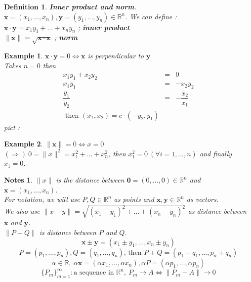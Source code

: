 \documentclass[a4paper,10pt]{article}
\newtheorem{defi}{Definition}
\newtheorem{ex}{Example}
\newtheorem{note}{Notes}
\begin{document}
\begin{defi}
	\textbf{Inner product and norm}.\\
	$ \mathbf{x} = (x_{1}, \dots, x_{n}) , \mathbf{y} = (y_{1}, \dots, y_{n}  ) \in \mathbb{R}^n $. We can define : \\
	$ \mathbf{x} \cdot \mathbf{y} = x_{1}y_{1} + \dots + x_{n}y_{n} $ ; \textbf{inner product}\\
	$ \parallel \mathbf{x} \parallel = \sqrt{\mathbf{x} \cdot \mathbf{x}} $ ; \textbf{norm}
\end{defi}

\begin{ex}
	$ \mathbf{x} \cdot \mathbf{y} =0 \Leftrightarrow \mathbf{x} $ is perpendicular to $ \mathbf{y} $\\
	Takes $ n=0 $ then
	\begin{eqnarray} \nonumber
	x_{1}y_{1} + x_{2}y_{2} &=& 0 \\ \nonumber
	x_{1}y_{1} &=& -x_{2}y_{2} \\ \nonumber
	\dfrac{y_{1}}{y_{2}} &=& - \dfrac{x_{2}}{x_{1}}\\ \nonumber
	\text{ then } (x_{1},x_{2}) = c \cdot(-y_{2},y_{1})
	\end{eqnarray}
	pict : 
\end{ex}

\begin{ex}
	$ \parallel \mathbf{x}\parallel=0 \Leftrightarrow x=0$\\
	$ (\Rightarrow) \ 0 = \parallel x \parallel^2 = x_{1}^2 + \dots + x_{n}^2 $, then $ x_{1}^2 =0 \ (\forall i =1, \dots, n )$ and finally $ x_{1}=0 $.
\end{ex}

\begin{note}
	$ \parallel x \parallel $ is the distance between $ \mathbf{0} = (0, \dots, 0) \in \mathbb{R}^n $ and $ \mathbf{x}= (x_{1}, \dots, x_{n}) $.\\
	For notation, we will use $ P,Q \in \mathbb{R}^n $ as points and  $ \mathbf{x}, \mathbf{y} \in \mathbb{R}^n $ as vectors. \\
	We also use $ \parallel x-y \parallel = \sqrt{(x_{1}-y_{1})^2 + \dots + (x_{n}-y_{n})^2} $ as distance between $ \mathbf{x} $ and $ \mathbf{y} $. \\
	$ \parallel P-Q \parallel $ is distance between $ P $ and $ Q $.
	\[ \mathbf{x} \pm \mathbf{y} = ( x_{1} \pm y_{1} , \dots, x_{n} \pm y_{n} ) \]
	\[ P=(p_{1}, \dots, p_{n}) ,  Q = (q_{1}, \dots, q_{n})  \text{, then } P+Q = (p_{1}+q_{1}, \dots, p_{n}+q_{n}) \]
	\[ \alpha \in \mathbb{R}, \ \alpha\mathbf{x} = (\alpha x_{1}, \dots, \alpha x_{n}),  \alpha P = (\alpha p_{1}, \dots, \alpha p_{n})\]
	\[  \{P_{m}\}_{m=1}^{\infty} : \text{a sequence in } \mathbb{R}^n , \ P_{m} \rightarrow A \Leftrightarrow \parallel P_{m}-A \parallel \rightarrow 0 \]
\end{note}
\end{document}

